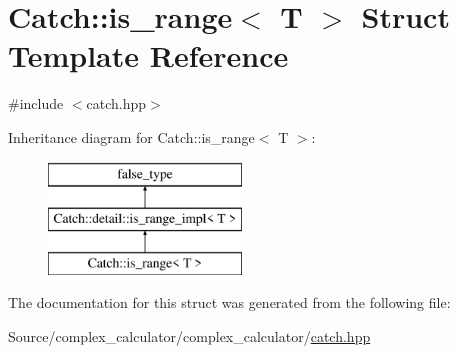 \hypertarget{struct_catch_1_1is__range}{}\section{Catch\+:\+:is\+\_\+range$<$ T $>$ Struct Template Reference}
\label{struct_catch_1_1is__range}


{\ttfamily \#include $<$catch.\+hpp$>$}

Inheritance diagram for Catch\+:\+:is\+\_\+range$<$ T $>$\+:\begin{figure}[H]
\begin{center}
\leavevmode
\includegraphics[height=3.000000cm]{struct_catch_1_1is__range}
\end{center}
\end{figure}


The documentation for this struct was generated from the following file\+:\begin{DoxyCompactItemize}
\item 
Source/complex\+\_\+calculator/complex\+\_\+calculator/\mbox{\hyperlink{catch_8hpp}{catch.\+hpp}}\end{DoxyCompactItemize}
